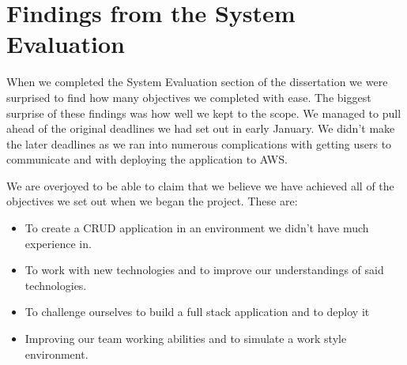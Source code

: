 \section{Findings from the System Evaluation}
When we completed the System Evaluation section of the dissertation we were surprised to find how many objectives we completed with ease. The biggest surprise of these findings was how well we kept to the scope. We managed to pull ahead of the original deadlines we had set out in early January. We didn't make the later deadlines as we ran into numerous complications with getting users to communicate and with deploying the application to AWS. \par
We are overjoyed to be able to claim that we believe we have achieved all of the objectives we set out when we began the project. These are:
\begin{itemize}
    \item To create a CRUD application in an environment we didn't have much experience in.
    \item To work with new technologies and to improve our understandings of said technologies.
    \item To challenge ourselves to build a full stack application and to deploy it
    \item Improving our team working abilities and to simulate a work style environment.
\end{itemize}

